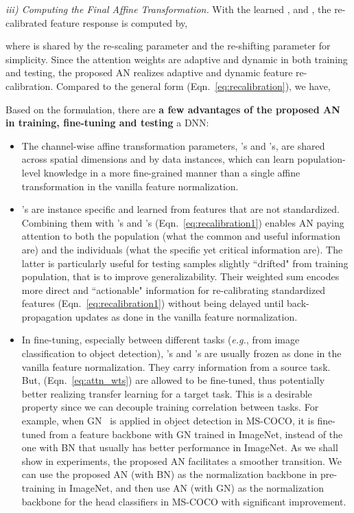 \documentclass[runningheads]{llncs}
\newcommand{\eg}{\emph{e.g.}}
\begin{document}
\textit{iii) Computing the Final Affine Transformation.} With the learned ,  and , the re-calibrated feature response is computed by, 

where  is shared by the re-scaling parameter and the re-shifting parameter for simplicity. Since the attention weights  are adaptive and dynamic in both training and testing, the proposed AN realizes adaptive and dynamic feature re-calibration. Compared to the general form (Eqn.~\ref{eq:recalibration}), we have,
 


Based on the formulation, there are \textbf{a few advantages of the proposed AN in training, fine-tuning and testing }a DNN: 
\begin{itemize}
\item The channel-wise affine transformation parameters, 's and 's, are shared across spatial dimensions and by data instances, which can learn population-level knowledge in a more fine-grained manner than a single affine transformation in the vanilla feature normalization. 
\item 's are instance specific and learned from features that are not standardized. Combining them with 's and 's (Eqn.~\ref{eq:recalibration1}) enables AN paying attention to both the population (what the common and useful information are) and the individuals (what the specific yet critical information are). The latter is particularly useful for testing samples slightly ``drifted" from training population, that is to improve generalizability. Their  weighted sum encodes more direct and ``actionable" information for re-calibrating standardized features (Eqn.~\ref{eq:recalibration1}) without being delayed until back-propagation updates as done in the vanilla feature normalization. 
\item  In fine-tuning, especially between different tasks (\eg, from image classification to object detection), 's and 's are usually frozen as done in the vanilla feature normalization. They carry information from a source task. But,  (Eqn.~\ref{eq:attn_wts}) are allowed to be fine-tuned, thus potentially better realizing transfer learning for a target task. 
This is a desirable property since we can decouple training correlation between tasks. For example, when GN~\cite{GroupNorm} is applied in object detection in MS-COCO, it is fine-tuned from a feature backbone with GN trained in ImageNet, instead of the one with BN that usually has better performance in ImageNet. 
As we shall show in experiments, the proposed AN facilitates a smoother transition. We can use the proposed AN (with BN) as the normalization backbone in pre-training in ImageNet, and then use AN (with GN) as the normalization backbone for the head classifiers in MS-COCO with significant improvement.    
\end{itemize}
\end{document}
